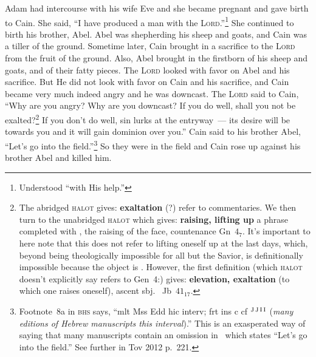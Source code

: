 
\begin{inparaenum}
     Adam had intercourse with his wife Eve and she became pregnant and gave birth to Cain. She said, ``I have produced a man with the \textsc{Lord}.''\footnote{Understood ``with His help.''}%
     She continued to birth his brother, Abel. Abel was shepherding his sheep and goats, and Cain was a tiller of the ground.%
     Sometime later, Cain brought in a sacrifice to the \textsc{Lord} from the fruit of the ground.%
     Also, Abel brought in the firstborn of his sheep and goats, and of their fatty pieces. The \textsc{Lord} looked with favor on Abel and his sacrifice.%
     But He did not look with favor on Cain and his sacrifice, and Cain became very much indeed angry and he was downcast.%
     The \textsc{Lord} said to Cain, ``Why are you angry? Why are you downcast?%
     If you do well, shall you not be exalted?\footnote{The abridged \textsc{halot} gives: \textbf{exaltation} (?) refer to commentaries. We then turn to the unabridged \textsc{halot} which gives: \textbf{raising, lifting up} a phrase completed with , the raising of the face, countenance Gn~$4_7$. It's important to here note that this does not refer to lifting oneself up at the last days, which, beyond being theologically impossible for all but the Savior, is definitionally impossible because the object is . However, the first definition (which \textsc{halot} doesn't explicitly say refers to Gen~4\thinspace:) gives: \textbf{elevation, exaltation} (to which one raises oneself), ascent sbj.\  Jb~$41_{17}$.} If you don't do well, sin lurks at the entryway~--- its desire will be towards you and it will gain dominion over you.''%
     Cain said to his brother Abel, ``Let's go into the field.''\footnote{Footnote~8a in \textsc{bhs} says, ``mlt Mss Edd hic interv; frt ins c \sampen\septuagint\peshitta\vulgate {} cf \targum$^\text{J\thinspace J\thinspace I\thinspace I}$ (\textit{many editions of Hebrew manuscripts this interval}).'' This is an exasperated way of saying that many manuscripts contain an omission in \masoretic\ which states ``Let's go into the field.'' See further in Tov 2012 p.\ 221.} So they were in the field and Cain rose up against his brother Abel and killed him.%
    
    
    
\end{inparaenum}
